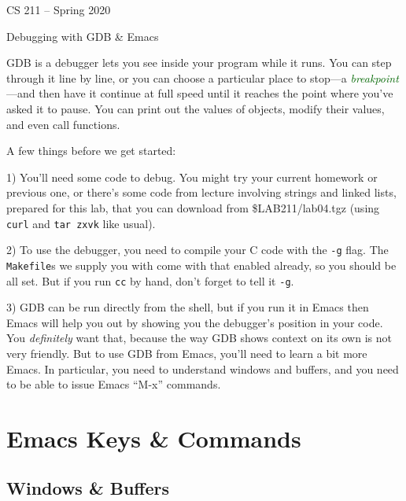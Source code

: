 \documentclass[11pt]{article}
\newcommand\keyterm[1]{\textcolor[HTML]{006600}{\emph{#1}}}
\def\LabTGZ{\$LAB211/lab04.tgz}
\begin{document}
%

\begin{center}
  \sffamily
  CS 211 – Spring 2020
  \par
  \Huge
  Debugging
  \Large
  with GDB \& Emacs
\end{center}

\begin{multicols}{2}

GDB is a debugger lets you see inside your program while it runs. You
  can step through it line by line, or you can choose a particular place
  to stop—a \keyterm{breakpoint}—and then have it continue at full speed
  until it reaches the point where you’ve asked it to pause. You can
  print out the values of objects, modify their values, and even call
  functions.

  A few things before we get started:


      1) You’ll need some code to debug. You might try your current
      homework or previous one, or there’s some code from lecture
      involving strings and linked lists, prepared for this lab, that
      you can download from \textsf{\LabTGZ} (using \verb!curl! and
      \verb!tar zxvk! like usual).

      2) To use the debugger, you need to compile your C code with the
      \verb!-g! flag. The \verb!Makefile!s we supply you with come
      with that enabled already, so you should be all set. But if you
      run \verb!cc! by hand, don't forget to tell it \verb!-g!.

      3) GDB can be run directly from the shell, but if you run it
      in Emacs then Emacs will help you out by showing you the
      debugger’s position in your code. You \emph{definitely} want that,
      because the way GDB shows context on its own
      is not very friendly. But to use GDB from Emacs, you’ll need to
      learn a bit more Emacs. In particular, you need to understand
      windows and buffers, and you need to be able to issue Emacs
      “\textsf{M-x}” commands.


\section*{Emacs Keys \& Commands}

\subsection*{Windows \& Buffers}


\end{multicols}
\end{document}
